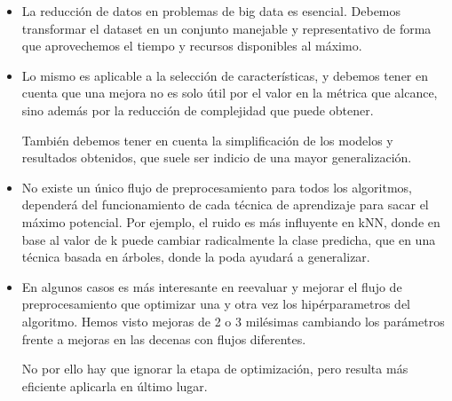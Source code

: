 \begin{itemize}
    \item La reducción de datos en problemas de big data es esencial. Debemos transformar el dataset en un conjunto manejable y representativo de forma que aprovechemos el tiempo y recursos disponibles al máximo.
    \item Lo mismo es aplicable a la selección de características, y debemos tener en cuenta que una mejora no es solo útil por el valor en la métrica que alcance, sino además por la reducción de complejidad que puede obtener. 

    También debemos tener en cuenta la simplificación de los modelos y resultados obtenidos, que suele ser indicio de una mayor generalización.

    \item No existe un único flujo de preprocesamiento para todos los algoritmos, dependerá del funcionamiento de cada técnica de aprendizaje para sacar el máximo potencial. Por ejemplo, el ruido es más influyente en kNN, donde en base al valor de k puede cambiar radicalmente la clase predicha, que en una técnica basada en árboles, donde la poda ayudará a generalizar.
    \item En algunos casos es más interesante en reevaluar y mejorar el flujo de preprocesamiento que optimizar una y otra vez los hipérparametros del algoritmo. Hemos visto mejoras de 2 o 3 milésimas cambiando los parámetros frente a mejoras en las decenas con flujos diferentes.
    
    No por ello hay que ignorar la etapa de optimización, pero resulta más eficiente aplicarla en último lugar.
\end{itemize}